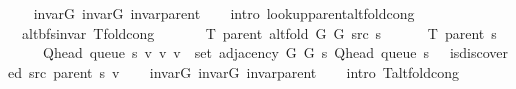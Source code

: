 \begin{isabellebody}
%
\isadelimproof
\ \ %
\endisadelimproof
%
\isatagproof
{}\isamarkupfalse%
\ invar{\isacharunderscore}{\kern0pt}G{}\ invar{\isacharunderscore}{\kern0pt}G{}\ invar{\isacharunderscore}{\kern0pt}parent\isanewline
\ \ \isamarkupfalse%
\ {\isacharparenleft}{\kern0pt}intro\ lookup{\isacharunderscore}{\kern0pt}parent{\isacharunderscore}{\kern0pt}alt{\isacharunderscore}{\kern0pt}fold{\isacharunderscore}{\kern0pt}cong{\isacharparenright}{\kern0pt}%
\endisatagproof
{\isafoldproof}%
%
\isadelimproof
\isanewline
%
\endisadelimproof
\isanewline
{}\isamarkupfalse%
\ {\isacharparenleft}{\kern0pt}\ alt{\isacharunderscore}{\kern0pt}bfs{\isacharunderscore}{\kern0pt}invar{\isacharparenright}{\kern0pt}\ T{\isacharunderscore}{\kern0pt}fold{\isacharunderscore}{\kern0pt}cong{\isacharcolon}{\kern0pt}\isanewline
\ \ \isanewline
\ \ \ \ {\isachardoublequoteopen}T\ {\isacharparenleft}{\kern0pt}parent\ {\isacharparenleft}{\kern0pt}alt{\isacharunderscore}{\kern0pt}fold\ G{}\ G{}\ src\ s{\isacharparenright}{\kern0pt}{\isacharparenright}{\kern0pt}\ {\isacharequal}{\kern0pt}\isanewline
\ \ \ \ \ T\ {\isacharparenleft}{\kern0pt}parent\ s{\isacharparenright}{\kern0pt}\ {\isasymunion}\isanewline
\ \ \ \ \ {\isacharbraceleft}{\kern0pt}{\isacharparenleft}{\kern0pt}Q{\isacharunderscore}{\kern0pt}head\ {\isacharparenleft}{\kern0pt}queue\ s{\isacharparenright}{\kern0pt}{\isacharcomma}{\kern0pt}\ v{\isacharparenright}{\kern0pt}\ {\isacharbar}{\kern0pt}v{\isachardot}{\kern0pt}\ v\ {\isasymin}\ set\ {\isacharparenleft}{\kern0pt}adjacency\ G{}\ G{}\ s\ {\isacharparenleft}{\kern0pt}Q{\isacharunderscore}{\kern0pt}head\ {\isacharparenleft}{\kern0pt}queue\ s{\isacharparenright}{\kern0pt}{\isacharparenright}{\kern0pt}{\isacharparenright}{\kern0pt}\ {\isasymand}\ {\isasymnot}\ is{\isacharunderscore}{\kern0pt}discovered\ src\ {\isacharparenleft}{\kern0pt}parent\ s{\isacharparenright}{\kern0pt}\ v{\isacharbraceright}{\kern0pt}{\isachardoublequoteclose}\isanewline
%
\isadelimproof
\ \ %
\endisadelimproof
%
\isatagproof
{}\isamarkupfalse%
\ invar{\isacharunderscore}{\kern0pt}G{}\ invar{\isacharunderscore}{\kern0pt}G{}\ invar{\isacharunderscore}{\kern0pt}parent\isanewline
\ \ \isamarkupfalse%
\ {\isacharparenleft}{\kern0pt}intro\ T{\isacharunderscore}{\kern0pt}alt{\isacharunderscore}{\kern0pt}fold{\isacharunderscore}{\kern0pt}cong{\isacharparenright}{\kern0pt}%
\endisatagproof
{\isafoldproof}%
%
\isadelimproof

\end{isabellebody}
